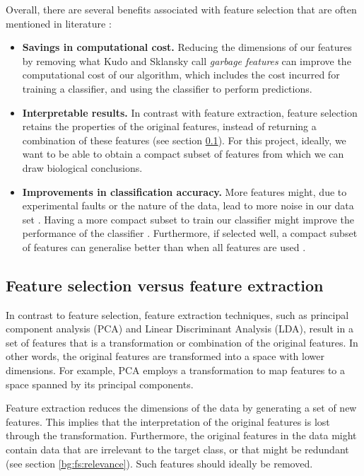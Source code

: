\documentclass[12pt, twoside, a4paper]{report}
\begin{document}
Overall, there are several benefits associated with feature selection that are often mentioned in literature \cite{RefWorks:140}:
\begin{itemize}
  \item \textbf{Savings in computational cost.} Reducing the dimensions of our features by removing what Kudo and Sklansky call \textit{garbage features} \cite{RefWorks:210} can improve the computational cost of our algorithm, which includes the cost incurred for training a classifier, and using the classifier to perform predictions.
  \item \textbf{Interpretable results.} In contrast with feature extraction, feature selection retains the properties of the original features, instead of returning a combination of these features (see section \ref{bg:fs:extraction}). For this project, ideally, we want to be able to obtain a compact subset of features from which we can draw biological conclusions.
  \item \textbf{Improvements in classification accuracy.} More features might, due to experimental faults or the nature of the data, lead to more noise in our data set \cite{RefWorks:163, RefWorks:197}. Having a more compact subset to train our classifier might improve the performance of the classifier \cite{RefWorks:174}. Furthermore, if selected well, a compact subset of features can generalise better than when all features are used \cite{RefWorks:233}.
\end{itemize}

\subsection{Feature selection versus feature extraction} \label{bg:fs:extraction}

In contrast to feature selection, feature extraction techniques, such as principal component analysis (PCA) and Linear Discriminant Analysis (LDA), result in a set of features that is a transformation or combination of the original features. In other words, the original features are transformed into a space with lower dimensions. For example, PCA employs a transformation to map features to a space spanned by its principal components.

Feature extraction reduces the dimensions of the data by generating a set of new features. This implies that the interpretation of the original features is lost through the transformation. Furthermore, the original features in the data might contain data that are irrelevant to the target class, or that might be redundant (see section \ref{bg:fs:relevance}). Such features should ideally be removed.
\end{document}
